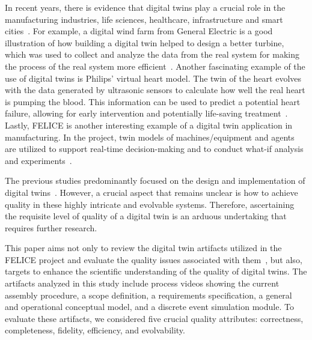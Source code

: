 \documentclass{llncs}
\begin{document}
    In recent years, there is evidence that digital twins play a crucial role 
    in the manufacturing industries, life sciences, healthcare, infrastructure and smart cities~\cite{Review2}.
    For example, a digital wind farm from General Electric is a good illustration of how building 
    a digital twin helped to design a better turbine, 
    which was used to collect and analyze the data from the real system for making the process of the 
    real system more efficient~\cite{GeneralElectricWindTurbine}. 
    Another fascinating example of the use of digital twins is Philips' virtual heart model. The 
    twin of the heart evolves with the data generated by ultrasonic sensors to calculate 
    how well the real heart is pumping the blood. This information can be used to predict a potential 
    heart failure, allowing for early intervention and potentially life-saving treatment~\cite{PhilipsHearth}. 
    Lastly, FELICE is another interesting example of a digital twin application in manufacturing. In 
    the project, twin models of machines/equipment and agents are utilized to support real-time decision-making 
    and to conduct what-if analysis and experiments~\cite{FELICE}.

    The previous studies predominantly focused on the design and 
    implementation of digital twins~\cite{Review1,Review2}. 
    However, a crucial aspect that remains unclear is how to achieve quality in these highly 
    intricate and evolvable systems. 
    Therefore, ascertaining the requisite level of quality of a digital twin is an arduous 
    undertaking that requires further research.

    This paper aims not only to review the digital twin artifacts utilized in the FELICE
    project and evaluate the quality issues associated with them~\cite{FELICE},  
    but also, targets to enhance the scientific understanding of the quality of digital twins.
    The artifacts analyzed in this study include process videos showing the current assembly procedure, 
    a scope definition, a requirements specification, a general and operational conceptual model, 
    and a discrete event simulation module. 
    To evaluate these artifacts, we considered five crucial quality attributes: correctness, 
    completeness, fidelity, efficiency, and evolvability.
    
\end{document}
